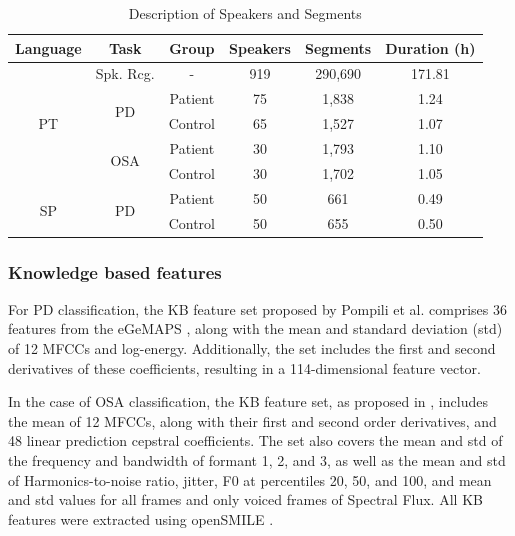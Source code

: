 \begin{table}[h]
  \centering
  \begin{tabular}{cccccc}
  \hline
  Language & Task & Group & Speakers & Segments & Duration (h) \\
    \hline
  \multirow{5}{*}{PT} & Spk. Rcg. & - & 919 & 290,690 & 171.81  \\ \cline{2-6}
  & \multirow{2}{*}{PD} & Patient & 75 & 1,838 & 1.24 \\
  & & Control & 65 & 1,527 & 1.07 \\ \cline{2-6}
  & \multirow{2}{*}{OSA} & Patient & 30 & 1,793 & 1.10 \\
  &  & Control & 30 & 1,702 & 1.05 \\
  \hline
  \multirow{2}{*}{SP} & \multirow{2}{*}{PD} & Patient & 50 & 661 & 0.49 \\
  & & Control & 50 & 655 & 0.50 \\

  \hline
  \end{tabular}
  \caption{Description of Speakers and Segments}
  \label{tab:xvect_data}
  \end{table}
  

\subsubsection{Knowledge based features}
For \ac{PD} classification, the \ac{KB} feature set proposed by Pompili et al. \cite{pompili2017automatic} comprises 36 features from the eGeMAPS \cite{eyben2015geneva}, along with the mean and standard deviation (std) of 12 \acp{MFCC} and log-energy. Additionally, the set includes the first and second derivatives of these coefficients, resulting in a 114-dimensional feature vector.

In the case of \ac{OSA} classification, the \ac{KB} feature set, as proposed in \cite{botelho2019speech}, includes the mean of 12 \acp{MFCC}, along with their first and second order derivatives, and 48 linear prediction cepstral coefficients. The set also covers the mean and std of the frequency and bandwidth of formant 1, 2, and 3, as well as the mean and std of Harmonics-to-noise ratio, jitter, F0 at percentiles 20, 50, and 100, and mean and std values for all frames and only voiced frames of Spectral Flux. All \ac{KB} features were extracted using openSMILE \cite{eyben2013recent}.

